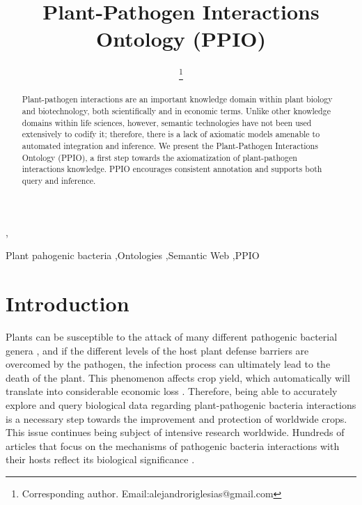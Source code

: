 \documentclass[sw]{iosart2c}
\begin{document}
\begin{frontmatter}

\title{Plant-Pathogen Interactions Ontology (PPIO)}
\runningtitle{}




\author[A]{ \thanks{Corresponding author. Email:alejandroriglesias@gmail.com}},
\author[A]{ }
\author[A]{ }
\author[A]{ }
\runningauthor{}
\address[A]{Biological Informatics Group, Centre for Plant Biotechnology and Genomics (CBGP), Technical University of Madrid (UPM), Spain}

\begin{abstract}
Plant-pathogen interactions are an important knowledge domain within plant biology and biotechnology, both scientifically and in economic terms. Unlike other knowledge domains within   life sciences, however, semantic technologies have not been used extensively to codify it; therefore, there is a lack of axiomatic models amenable to automated integration and inference. We present the Plant-Pathogen Interactions Ontology (PPIO), a first step towards the axiomatization of plant-pathogen interactions knowledge. PPIO encourages consistent annotation and supports both query and inference.
\end{abstract}

\begin{keyword}
 Plant pahogenic bacteria \sep Ontologies \sep Semantic Web \sep PPIO
\end{keyword}

\end{frontmatter}


\section{Introduction}\label{s1}

Plants can be susceptible to the attack of many different pathogenic bacterial genera \cite{Mansfield}, and if the different levels of the host plant defense barriers are overcomed by the pathogen, the infection process can ultimately lead to the death of the plant. This phenomenon affects crop yield, which automatically will translate into considerable economic loss \cite{Montesinos}. Therefore, being able to accurately explore and query biological data regarding plant-pathogenic bacteria interactions is a necessary step towards the improvement and protection of worldwide crops. This issue continues being subject of intensive research worldwide. Hundreds of articles that focus on the mechanisms of pathogenic bacteria interactions with their hosts reflect its biological significance\cite{DeWit} \cite {Dodds}. 
\end{document}
